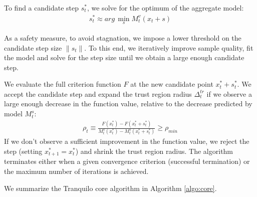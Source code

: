 To find a candidate step $s^{*}_t$, we solve for the optimum of the aggregate model:
\begin{align}
    s^*_t\approx arg\,\min\limits_sM_t^v(x_t+s)
    \label{eq:cand-step}
\end{align}


As a safety measure, to avoid stagnation, we impose a lower threshold on the candidate step size $\lVert s_t\rVert$. To this end, we iteratively improve sample quality, fit the model and solve for the step size until we obtain a large enough candidate step.

We evaluate the full criterion function $F$ at the new candidate point $x^{*}_t+s^{*}_t$. We accept the candidate step and expand the trust region radius $\Delta_t^{tr}$ if we observe a large enough decrease in the function value, relative to the decrease predicted by model $M_t^s$:
\begin{align}
    \rho_t\equiv\frac{F(x^*_t)-F(x^{*}_t+s^{*}_t)}{M^s_t(x^{*}_t)-M^s_t(x^{*}_t+s^{*}_t)}\geq\rho_{min}
    \label{eq:rho}
\end{align}
If we don't observe a sufficient improvement in the function value, we reject the step (setting $x^{*}_{t+1}=x_t^{*}$) and shrink the trust region radius. The algorithm terminates either when a given convergence criterion (successful termination) or the maximum number of iterations is achieved.

We summarize the Tranquilo core algorithm in Algorithm \ref{algo:core}.

